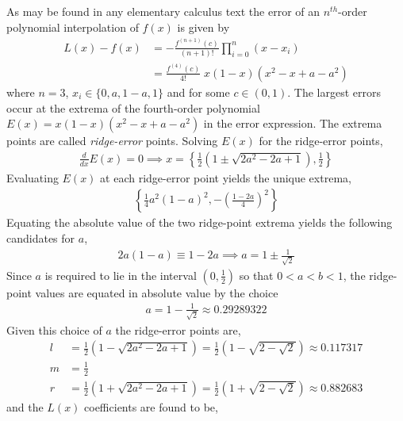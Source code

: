 As may be found in any elementary calculus text the error of an $n^{th}$-order polynomial interpolation of $f(x)$ is given by
\begin{align}
L(x) - f(x) &= -\frac{f^{(n+1)}(c)}{(n+1)!}\prod_{i=0}^n(x - x_i)\\
\label{eq:TaylorError}
            &= \frac{f^{(4)}(c)}{4!}\;x(1-x)(x^2-x+a-a^2)
\end{align}
where $n=3$, $x_i \in \{0,a,1-a,1\}$ and for some $c \in (0,1)$. The largest errors occur at the extrema of the fourth-order polynomial $E(x) = x(1-x)(x^2-x+a-a^2)$ in the error expression. The extrema points are called \emph{ridge-error} points. Solving $E(x)$ for the ridge-error points,
\begin{align*}
\frac{d}{dx}E(x) = 0 \implies 
x = \left\{\frac{1}{2}\left(1\pm\sqrt{2a^2-2a+1}\right), \frac{1}{2}\right\}
\end{align*}
Evaluating $E(x)$ at each ridge-error point yields the unique extrema,
\begin{align*}
\left\{\frac{1}{4}a^2(1-a)^2, -\left(\frac{1-2a}{4}\right)^2\right\}
\end{align*}
Equating the absolute value of the two ridge-point extrema yields the following candidates for $a$,
\begin{align*}
2a(1-a) \equiv 1-2a \implies a = 1 \pm \frac{1}{\sqrt{2}}
\end{align*}
Since $a$ is required to lie in the interval $(0,\frac{1}{2})$ so that $0 < a < b < 1$, the ridge-point values are equated in absolute value by the choice
\begin{align}
a = 1-\frac{1}{\sqrt{2}} \approx 0.29289322
\label{eq:LagrangeInterpolationPoint}
\end{align}
Given this choice of $a$ the ridge-error points are,
\begin{align*}
l &= \frac{1}{2}\left(1-\sqrt{2a^2-2a+1}\right) = \frac{1}{2}\left(1 - \sqrt{2-\sqrt{2}}\right) \approx 0.117317\\
m &= \frac{1}{2}\\
r &= \frac{1}{2}\left(1+\sqrt{2a^2-2a+1}\right) = \frac{1}{2}\left(1 + \sqrt{2-\sqrt{2}}\right) \approx 0.882683
\end{align*}
and the $L(x)$ coefficients are found to be,
